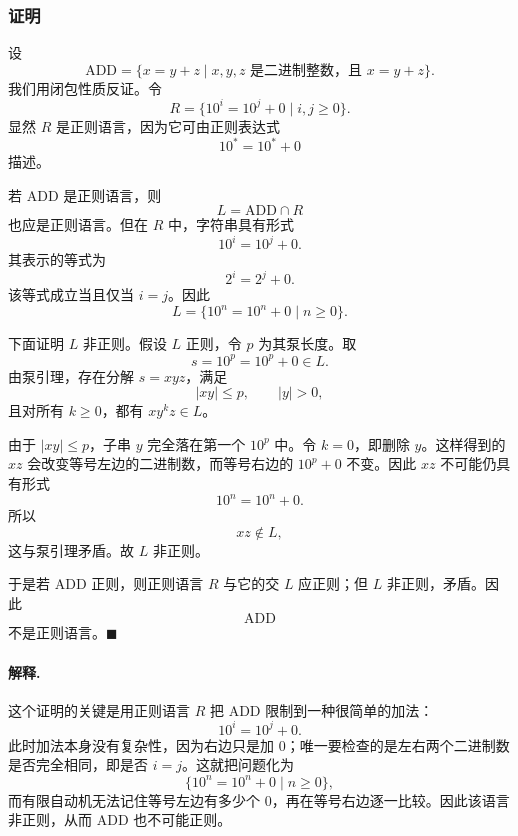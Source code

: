 \begin{answerred}
\subsubsection*{证明}

设
\[
    \mathrm{ADD}
    =
    \{x=y+z\mid x,y,z\text{ 是二进制整数，且 }x=y+z\}.
\]
我们用闭包性质反证。令
\[
    R=\{10^i=10^j+0\mid i,j\ge 0\}.
\]
显然 $R$ 是正则语言，因为它可由正则表达式
\[
    10^*=10^*+0
\]
描述。

若 $\mathrm{ADD}$ 是正则语言，则
\[
    L=\mathrm{ADD}\cap R
\]
也应是正则语言。但在 $R$ 中，字符串具有形式
\[
    10^i=10^j+0.
\]
其表示的等式为
\[
    2^i=2^j+0.
\]
该等式成立当且仅当 $i=j$。因此
\[
    L=\{10^n=10^n+0\mid n\ge 0\}.
\]

下面证明 $L$ 非正则。假设 $L$ 正则，令 $p$ 为其泵长度。取
\[
    s=10^p=10^p+0\in L.
\]
由泵引理，存在分解 $s=xyz$，满足
\[
    |xy|\le p,\qquad |y|>0,
\]
且对所有 $k\ge 0$，都有 $xy^kz\in L$。

由于 $|xy|\le p$，子串 $y$ 完全落在第一个 $10^p$ 中。令 $k=0$，即删除 $y$。这样得到的 $xz$ 会改变等号左边的二进制数，而等号右边的 $10^p+0$ 不变。因此 $xz$ 不可能仍具有形式
\[
    10^n=10^n+0.
\]
所以
\[
    xz\notin L,
\]
这与泵引理矛盾。故 $L$ 非正则。

于是若 $\mathrm{ADD}$ 正则，则正则语言 $R$ 与它的交 $L$ 应正则；但 $L$ 非正则，矛盾。因此
\[
    \mathrm{ADD}
\]
不是正则语言。$\blacksquare$

\begin{answernote}
\paragraph{解释.}
这个证明的关键是用正则语言 $R$ 把 $\mathrm{ADD}$ 限制到一种很简单的加法：
\[
    10^i=10^j+0.
\]
此时加法本身没有复杂性，因为右边只是加 $0$；唯一要检查的是左右两个二进制数是否完全相同，即是否 $i=j$。这就把问题化为
\[
    \{10^n=10^n+0\mid n\ge 0\},
\]
而有限自动机无法记住等号左边有多少个 $0$，再在等号右边逐一比较。因此该语言非正则，从而 $\mathrm{ADD}$ 也不可能正则。
\end{answernote}
\end{answerred}

\clearpage
